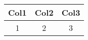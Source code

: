 \begin{table}[h]
  \caption{}
  \label{tab:}
  \center
  \begin{tabular}{||c c c||}
    \hline
    Col1 & Col2 & Col3 \\
    \hline\hline
    1 & 2 & 3 \\
    \hline
  \end{tabular}
\end{table}
